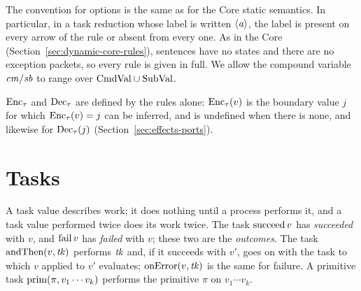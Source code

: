 The convention for options is the same as for the Core static semantics. In
particular, in a task reduction whose label is written $\langle \mathit{a}\rangle$, the
label is present on every arrow of the rule or absent from every one. As in
the Core (Section~\ref{sec:dynamic-core-rules}), sentences have no states and
there are no exception packets, so every rule is given in full. %
We allow the compound variable $\mathit{cm}/\mathit{sb}$ to range over
$\mathrm{CmdVal}\cup\mathrm{SubVal}$.

$\mathrm{Enc}_{\tau}$ and $\mathrm{Dec}_{\tau}$ are defined by the rules alone: $\mathrm{Enc}_{\tau}(v)$
is the boundary value $j$ for which $\mathrm{Enc}_{\tau}(v)=j$ can be inferred, and is
undefined when there is none, and likewise for $\mathrm{Dec}_{\tau}(j)$
(Section~\ref{sec:effects-ports}).

\section{Tasks}\label{sec:effects-tasks}

A task value describes work; it does nothing until a process performs it, and
a task value performed twice does its work twice. %
The task $\mathrm{succeed}\,v$ has \emph{succeeded} with $v$, and $\mathrm{fail}\,v$ has
\emph{failed} with $v$; these two are the \emph{outcomes}. The task
$\mathrm{andThen}(v,\mathit{tk})$ performs $\mathit{tk}$ and, if it succeeds with $v'$, goes on
with the task to which $v$ applied to $v'$ evaluates; $\mathrm{onError}(v,\mathit{tk})$ is
the same for failure. A primitive task $\mathrm{prim}(\pi,v_1\cdots v_k)$ performs
the primitive $\pi$ on $v_1\cdots v_k$.


